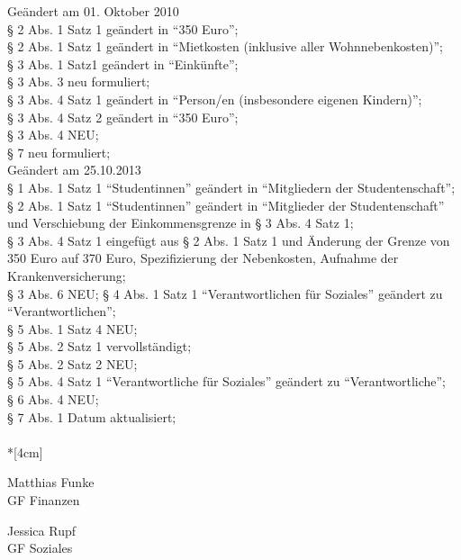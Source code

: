 Geändert am 01. Oktober 2010 \\
§ 2 Abs. 1 Satz 1 geändert in "`350 Euro"'; \\
§ 2 Abs. 1 Satz 1 geändert in "`Mietkosten (inklusive aller Wohnnebenkosten)"'; \\
§ 3 Abs. 1 Satz1 geändert in "`Einkünfte"'; \\
§ 3 Abs. 3 neu formuliert; \\
§ 3 Abs. 4 Satz 1 geändert in "`Person/en (insbesondere eigenen Kindern)"'; \\
§ 3 Abs. 4 Satz 2 geändert in "`350 Euro"'; \\
§ 3 Abs. 4 NEU; \\
§ 7 neu formuliert; \\

Geändert am 25.10.2013 \\
§ 1 Abs. 1 Satz 1 "`Studentinnen"' geändert in "`Mitgliedern der Studentenschaft"'; \\
§ 2 Abs. 1 Satz 1 "`Studentinnen"' geändert in "`Mitglieder der Studentenschaft"' und Verschiebung der Einkommensgrenze in § 3 Abs. 4 Satz 1; \\
§ 3 Abs. 4 Satz 1 eingefügt aus § 2 Abs. 1 Satz 1 und Änderung der Grenze von 350 Euro auf 370 Euro, Spezifizierung der Nebenkosten, Aufnahme der Krankenversicherung; \\
§ 3 Abs. 6 NEU;
§ 4 Abs. 1 Satz 1 "`Verantwortlichen für Soziales"' geändert zu "`Verantwortlichen"';\\
§ 5 Abs. 1 Satz 4 NEU;\\
§ 5 Abs. 2 Satz 1 vervollständigt;\\
§ 5 Abs. 2 Satz 2 NEU;\\
§ 5 Abs. 4 Satz 1 "`Verantwortliche für Soziales"' geändert zu "`Verantwortliche"';\\
§ 6 Abs. 4 NEU;\\
§ 7 Abs. 1 Datum aktualisiert;\\

\normalsize
~\\*[4cm]
\begin{center}
\hspace*{\fill}
\parbox{7cm}{Matthias Funke\\GF Finanzen}
\hfill\parbox{7cm}{Jessica Rupf \\GF Soziales}
\hspace*{\fill}
\end{center}